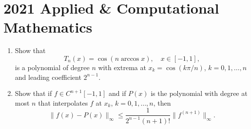 \section{2021 Applied \& Computational Mathematics}

\begin{exercise}
\label{applied:2021:1}
\begin{enumerate}
\item[(a)] Show that
\[
T_{n}(x)=\cos(n\arccos x), \quad x \in [-1, 1],
\]
is a polynomial of degree $n$ with extrema at $x_{k}=\cos(k\pi/n)$, $k=0,1,\dots,n$ and leading coefficient $2^{n-1}$.
\item[(b)] Show that if $f\in C^{n+1}[-1,1]$ and if $P(x)$ is the polynomial with degree at most $n$ that interpolates $f$ at $x_{k}$, $k=0,1,\dots,n$, then
\[
\|f(x)-P(x)\|_{\infty}\leq\frac{1}{2^{n-1}(n+1)!}\|f^{(n+1)}\|_{\infty}.
\]
\end{enumerate}
\end{exercise}

